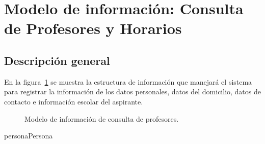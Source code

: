 \newpage

\section{Modelo de información: Consulta de Profesores y Horarios}

\subsection{Descripción general}

En la figura~\ref{fig:modeloinfoprofe} se muestra la estructura de información que manejará el sistema para registrar la información de los datos personales, datos del domicilio, datos de contacto e información escolar del aspirante.

\begin{figure}[htbp!]
	\begin{center}
		\caption{Modelo de información de consulta de profesores.}
		\label{fig:modeloinfoprofe}
	\end{center}
\end{figure}


\begin{BusinessEntity}{persona}{Persona}
	
	
	
	
	
\end{BusinessEntity}

